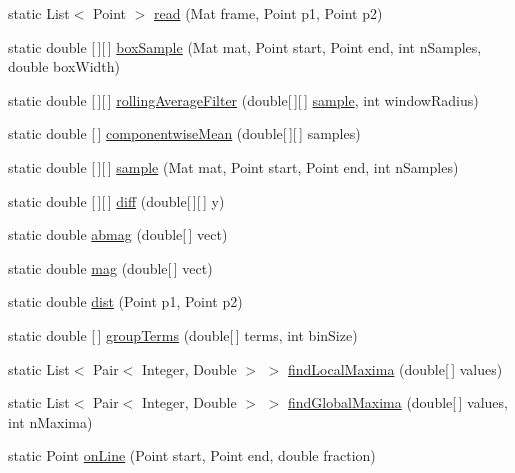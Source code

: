 \begin{DoxyCompactItemize}
\item 
static List$<$ Point $>$ \hyperlink{classohm_1_1imageprocessing_1_1_band_reader_a335c53bee0b8cd3f58939bee33ea5a0e}{read} (Mat frame, Point p1, Point p2)
\item 
static double \mbox{[}$\,$\mbox{]}\mbox{[}$\,$\mbox{]} \hyperlink{classohm_1_1imageprocessing_1_1_band_reader_a70bbf2127dd344ecbaf8190526f65d8c}{box\+Sample} (Mat mat, Point start, Point end, int n\+Samples, double box\+Width)
\item 
static double \mbox{[}$\,$\mbox{]}\mbox{[}$\,$\mbox{]} \hyperlink{classohm_1_1imageprocessing_1_1_band_reader_a4197e296bcb749a582d401e171b06964}{rolling\+Average\+Filter} (double\mbox{[}$\,$\mbox{]}\mbox{[}$\,$\mbox{]} \hyperlink{classohm_1_1imageprocessing_1_1_band_reader_aeac10376ede4d964a2e652f001416581}{sample}, int window\+Radius)
\item 
static double \mbox{[}$\,$\mbox{]} \hyperlink{classohm_1_1imageprocessing_1_1_band_reader_a7a65be0d91e263ba95be40a839a1e9dd}{componentwise\+Mean} (double\mbox{[}$\,$\mbox{]}\mbox{[}$\,$\mbox{]} samples)
\item 
static double \mbox{[}$\,$\mbox{]}\mbox{[}$\,$\mbox{]} \hyperlink{classohm_1_1imageprocessing_1_1_band_reader_aeac10376ede4d964a2e652f001416581}{sample} (Mat mat, Point start, Point end, int n\+Samples)
\item 
static double \mbox{[}$\,$\mbox{]}\mbox{[}$\,$\mbox{]} \hyperlink{classohm_1_1imageprocessing_1_1_band_reader_a1482e17c3db23f374ec320d363fffac1}{diff} (double\mbox{[}$\,$\mbox{]}\mbox{[}$\,$\mbox{]} y)
\item 
static double \hyperlink{classohm_1_1imageprocessing_1_1_band_reader_a89a1ca359c7d26536f149c4dcc38cc99}{abmag} (double\mbox{[}$\,$\mbox{]} vect)
\item 
static double \hyperlink{classohm_1_1imageprocessing_1_1_band_reader_a5a853fa56348caf878ed0fc9c7e0ccaa}{mag} (double\mbox{[}$\,$\mbox{]} vect)
\item 
static double \hyperlink{classohm_1_1imageprocessing_1_1_band_reader_a10ab79859262742046ab3b3dda006c60}{dist} (Point p1, Point p2)
\item 
static double \mbox{[}$\,$\mbox{]} \hyperlink{classohm_1_1imageprocessing_1_1_band_reader_af0fe7156595bf275194c8785477ecd71}{group\+Terms} (double\mbox{[}$\,$\mbox{]} terms, int bin\+Size)
\item 
static List$<$ Pair$<$ Integer, Double $>$ $>$ \hyperlink{classohm_1_1imageprocessing_1_1_band_reader_a14e650d56c1f86b422eb2897ed359ade}{find\+Local\+Maxima} (double\mbox{[}$\,$\mbox{]} values)
\item 
static List$<$ Pair$<$ Integer, Double $>$ $>$ \hyperlink{classohm_1_1imageprocessing_1_1_band_reader_ac5c3bd6e24700bc9bcf8d882c044d1b6}{find\+Global\+Maxima} (double\mbox{[}$\,$\mbox{]} values, int n\+Maxima)
\item 
static Point \hyperlink{classohm_1_1imageprocessing_1_1_band_reader_ab6d2dfccd0b44f46dad708ecee256124}{on\+Line} (Point start, Point end, double fraction)
\end{DoxyCompactItemize}


